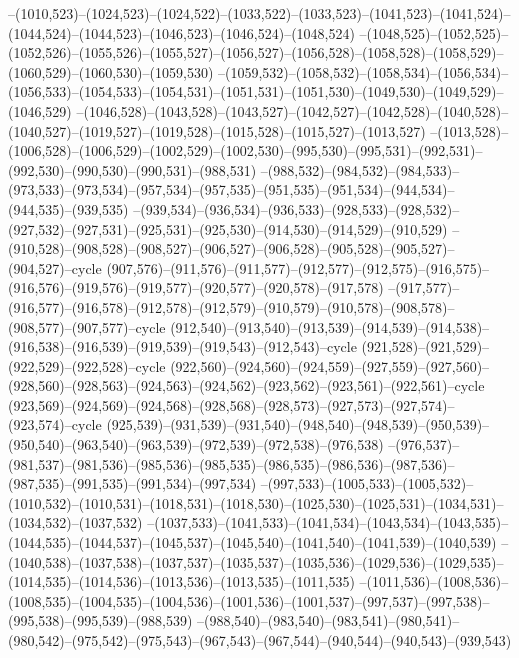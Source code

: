 --(1010,523)--(1024,523)--(1024,522)--(1033,522)--(1033,523)--(1041,523)--(1041,524)--(1044,524)--(1044,523)--(1046,523)--(1046,524)--(1048,524)
--(1048,525)--(1052,525)--(1052,526)--(1055,526)--(1055,527)--(1056,527)--(1056,528)--(1058,528)--(1058,529)--(1060,529)--(1060,530)--(1059,530)
--(1059,532)--(1058,532)--(1058,534)--(1056,534)--(1056,533)--(1054,533)--(1054,531)--(1051,531)--(1051,530)--(1049,530)--(1049,529)--(1046,529)
--(1046,528)--(1043,528)--(1043,527)--(1042,527)--(1042,528)--(1040,528)--(1040,527)--(1019,527)--(1019,528)--(1015,528)--(1015,527)--(1013,527)
--(1013,528)--(1006,528)--(1006,529)--(1002,529)--(1002,530)--(995,530)--(995,531)--(992,531)--(992,530)--(990,530)--(990,531)--(988,531)
--(988,532)--(984,532)--(984,533)--(973,533)--(973,534)--(957,534)--(957,535)--(951,535)--(951,534)--(944,534)--(944,535)--(939,535)
--(939,534)--(936,534)--(936,533)--(928,533)--(928,532)--(927,532)--(927,531)--(925,531)--(925,530)--(914,530)--(914,529)--(910,529)
--(910,528)--(908,528)--(908,527)--(906,527)--(906,528)--(905,528)--(905,527)--(904,527)--cycle
(907,576)--(911,576)--(911,577)--(912,577)--(912,575)--(916,575)--(916,576)--(919,576)--(919,577)--(920,577)--(920,578)--(917,578)
--(917,577)--(916,577)--(916,578)--(912,578)--(912,579)--(910,579)--(910,578)--(908,578)--(908,577)--(907,577)--cycle
(912,540)--(913,540)--(913,539)--(914,539)--(914,538)--(916,538)--(916,539)--(919,539)--(919,543)--(912,543)--cycle
(921,528)--(921,529)--(922,529)--(922,528)--cycle
(922,560)--(924,560)--(924,559)--(927,559)--(927,560)--(928,560)--(928,563)--(924,563)--(924,562)--(923,562)--(923,561)--(922,561)--cycle
(923,569)--(924,569)--(924,568)--(928,568)--(928,573)--(927,573)--(927,574)--(923,574)--cycle
(925,539)--(931,539)--(931,540)--(948,540)--(948,539)--(950,539)--(950,540)--(963,540)--(963,539)--(972,539)--(972,538)--(976,538)
--(976,537)--(981,537)--(981,536)--(985,536)--(985,535)--(986,535)--(986,536)--(987,536)--(987,535)--(991,535)--(991,534)--(997,534)
--(997,533)--(1005,533)--(1005,532)--(1010,532)--(1010,531)--(1018,531)--(1018,530)--(1025,530)--(1025,531)--(1034,531)--(1034,532)--(1037,532)
--(1037,533)--(1041,533)--(1041,534)--(1043,534)--(1043,535)--(1044,535)--(1044,537)--(1045,537)--(1045,540)--(1041,540)--(1041,539)--(1040,539)
--(1040,538)--(1037,538)--(1037,537)--(1035,537)--(1035,536)--(1029,536)--(1029,535)--(1014,535)--(1014,536)--(1013,536)--(1013,535)--(1011,535)
--(1011,536)--(1008,536)--(1008,535)--(1004,535)--(1004,536)--(1001,536)--(1001,537)--(997,537)--(997,538)--(995,538)--(995,539)--(988,539)
--(988,540)--(983,540)--(983,541)--(980,541)--(980,542)--(975,542)--(975,543)--(967,543)--(967,544)--(940,544)--(940,543)--(939,543)
